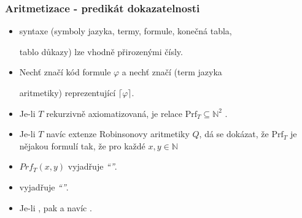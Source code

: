     \subsubsection*{Aritmetizace - predikát dokazatelnosti}
    \begin{itemize}
    \item {} syntaxe (symboly jazyka, termy, formule, konečná tabla,
    \smallskip
    
    tablo důkazy) lze vhodně  přirozenými čísly.
    \smallskip
    
    \item Nechť \mdef{$\lceil \varphi \rceil$} značí kód formule $\varphi$ a nechť \mdef{$\underline{\varphi}$} značí  (term jazyka
    \smallskip
    
    aritmetiky) reprezentující $\lceil \varphi \rceil$.
    \smallskip
    
    \item Je-li $T$ rekurzivně axiomatizovaná, je relace $\mathrm{Prf}_T\subseteq \mathbb{N}^2$ .

    

    \item Je-li $T$ navíc extenze Robinsonovy aritmetiky $Q$, dá se dokázat, že $\mathrm{Prf}_T$ je    
     nějakou formulí  tak, že pro každé $x,y\in \mathbb{N}$

    
    \item $Prf_T(x,y)$ vyjadřuje {\it ``''}.
    \smallskip
    
    \item {} vyjadřuje {\it ``''}.
    \smallskip
    
    \item Je-li , pak  a navíc .
    \end{itemize}
    
